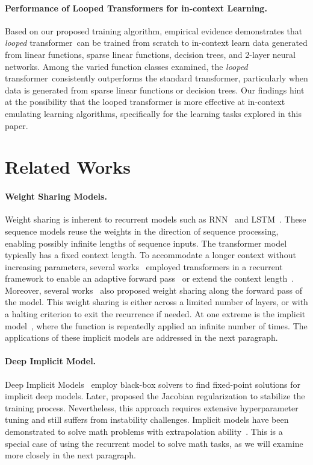 \documentclass{article} %
\newcommand{\loopTF}{\emph{looped} transformer}
\theoremstyle{plain}
\theoremstyle{definition}
\theoremstyle{remark}
\begin{document}
\paragraph{Performance of Looped Transformers for in-context Learning.} Based on our proposed training algorithm, empirical evidence demonstrates that \loopTF\ can be trained from scratch to in-context learn data generated from linear functions, sparse linear functions, decision trees, and 2-layer neural networks. Among the varied function classes examined, the \loopTF\ consistently outperforms the standard transformer, particularly when data is generated from sparse linear functions or decision trees. Our findings hint at the possibility that the looped transformer is more effective at in-context emulating learning algorithms, specifically for the learning tasks explored in this paper.

\section{Related Works}
\paragraph{Weight Sharing Models.} 
Weight sharing is inherent to recurrent models such as RNN~\citep{Bengio2003ANP} and LSTM~\citep{Hochreiter1997LongSM}. These sequence models reuse the weights in the direction of sequence processing, enabling possibly infinite lengths of sequence inputs. The transformer model~\citep{Vaswani2017AttentionIA, Devlin2019BERTPO} typically has a fixed context length. To accommodate a longer context without increasing parameters, several works~\citep{Dai2019TransformerXLAL, Wang2019RTransformerRN, Hutchins2022BlockRecurrentT} employed transformers in a recurrent framework to enable an adaptive forward pass~\citep{Dai2019TransformerXLAL} or extend the context length~\citep{Hutchins2022BlockRecurrentT}. Moreover, several works~\citep{Lan2019ALBERTAL, Jaegle2021PerceiverGP, Dehghani2018UniversalT} also proposed weight sharing along the forward pass of the model. This weight sharing is either across a limited number of layers, or with a halting criterion to exit the recurrence if needed. At one extreme is the implicit model~\citep{Bai2019DeepEM}, where the function is repeatedly applied an infinite number of times. The applications of these implicit models are addressed in the next paragraph.
\paragraph{Deep Implicit Model.}
Deep Implicit Models~\citep{Bai2018TrellisNF, Bai2019DeepEM, Bai2020MultiscaleDE, Winston2020MonotoneOE, Bai2022NeuralDE} employ black-box solvers to find fixed-point solutions for implicit deep models.
Later, \citet{Bai2021StabilizingEM} proposed the Jacobian regularization to stabilize the training process. Nevertheless, this approach requires extensive hyperparameter tuning and still suffers from instability challenges.
Implicit models have been demonstrated to solve math problems with extrapolation ability~\citep{Decugis2022OnTA}. This is a special case of using the recurrent model to solve math tasks, as we will examine more closely in the next paragraph.
\end{document}

